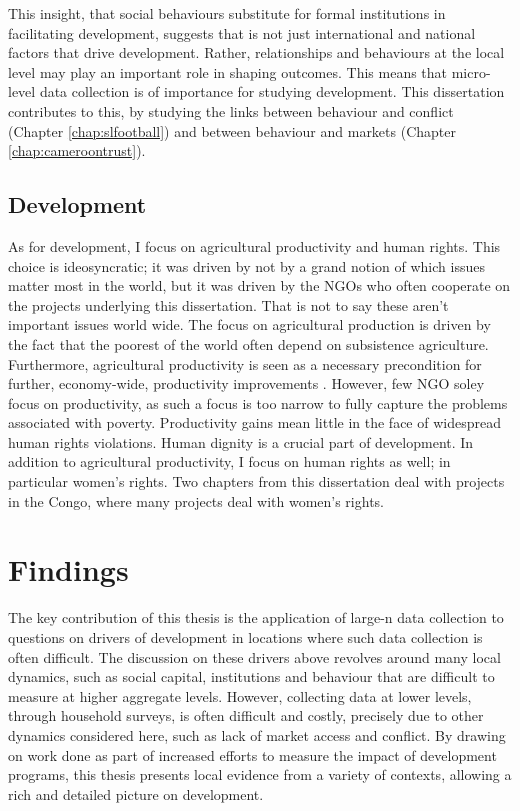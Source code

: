 This insight, that social behaviours substitute for formal institutions in facilitating development, suggests that is not just international and national factors that drive development. Rather, relationships and behaviours at the local level may play an important role in shaping outcomes. This means that micro-level data collection is of importance for studying development. This dissertation contributes to this, by studying the links between behaviour and conflict (Chapter \ref{chap:slfootball}) and between behaviour and markets (Chapter \ref{chap:cameroontrust}).


\subsection{Development}
As for development, I focus on agricultural productivity and human rights. This choice is ideosyncratic; it was driven by not by a grand notion of which issues matter most in the world, but it was driven by the NGOs who often cooperate on the projects underlying this dissertation. That is not to say these aren't important issues world wide. The focus on agricultural production is driven by the fact that the poorest of the world often depend on subsistence agriculture. Furthermore, agricultural productivity is seen as a necessary precondition for further, economy-wide, productivity improvements \citep{WorldBank2008}. However, few NGO soley focus on productivity, as such a focus is too narrow to fully capture the problems associated with poverty. Productivity gains mean little in the face of widespread human rights violations. Human dignity is a crucial part of development. In addition to agricultural productivity, I focus on human rights as well; in particular women's rights. Two chapters from this dissertation deal with projects in the Congo, where many projects deal with women's rights.

\section{Findings}
The key contribution of this thesis is the application of large-n data collection to questions on drivers of development in locations where such data collection is often difficult. The discussion on these drivers above revolves around many local dynamics, such as social capital, institutions and behaviour that are difficult to measure at higher aggregate levels. However, collecting data at lower levels, through household surveys, is often difficult and costly, precisely due to other dynamics considered here, such as lack of market access and conflict. By drawing on work done as part of increased efforts to measure the impact of development programs, this thesis presents local evidence from a variety of contexts, allowing a rich and detailed picture on development.

